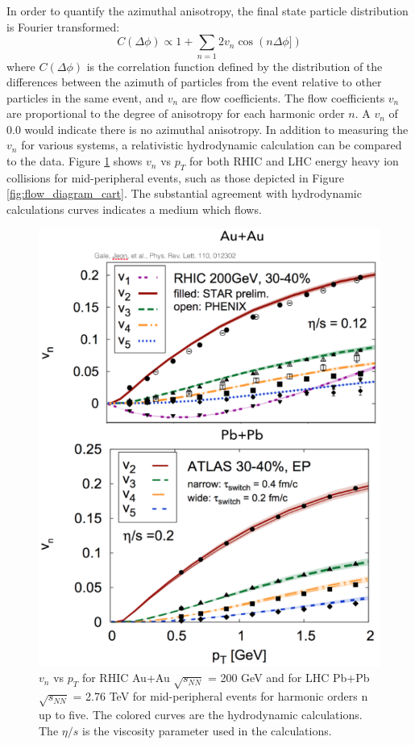 In order to quantify the azimuthal anisotropy, the final state particle distribution is Fourier transformed:
\begin{equation}\label{eqn:dndphi}
  C(\Delta\phi) \propto 1 + \sum_{n=1}2 v_{n}\cos(n\Delta\phi]) 
\end{equation}
where $C(\Delta\phi)$ is the correlation function defined by the distribution of the differences between the azimuth of particles from the event relative to other particles in the same event, and $v_n$ are flow coefficients. The flow coefficients $v_n$ are proportional to the degree of anisotropy for each harmonic order $n$. A $v_n$ of 0.0 would indicate there is no azimuthal anisotropy. In addition to measuring the $v_n$ for various systems, a relativistic hydrodynamic calculation can be compared to the data. Figure \ref{fig:vn_aa_hydro} shows $v_n$ vs $p_T$ for both RHIC and LHC energy heavy ion collisions for mid-peripheral events, such as those depicted in Figure \ref{fig:flow_diagram_cart}. The substantial agreement with hydrodynamic calculations  curves indicates a medium which flows.

\begin{figure}[!ht]
\begin{center}
\includegraphics[width=0.65\linewidth]{figs/vn_aa_pbpb_hydro.PNG}
\caption{$v_n$ vs $p_T$ for RHIC Au+Au $\sqrt{s_{NN}}$ = 200 GeV and for LHC Pb+Pb $\sqrt{s_{NN}}$ = 2.76 TeV for mid-peripheral events for harmonic orders n up to five. The colored curves are the hydrodynamic calculations. The $\eta/s$ is the viscosity parameter used in the calculations.~\cite{PhysRevLett.110.012302}}
\end{center}
\label{fig:vn_aa_hydro}
\end{figure}

